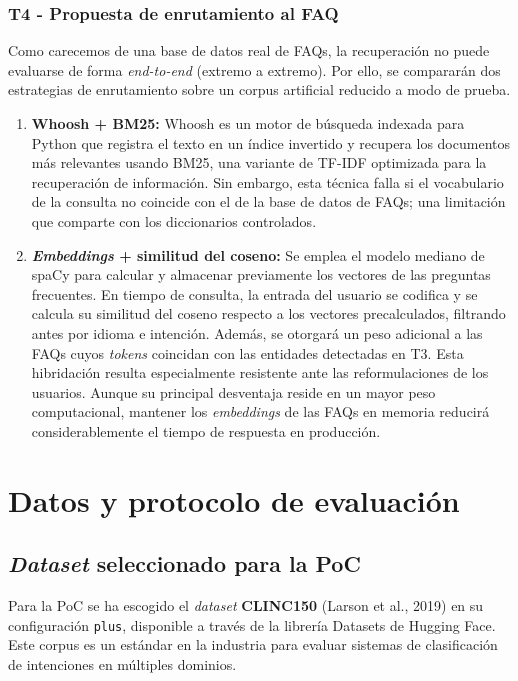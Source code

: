 \documentclass[11pt,a4paper,twoside]{article}
\theoremstyle{definition}
\numberwithin{equation}{section}
\begin{document}
\subsubsection*{T4 - Propuesta de enrutamiento al FAQ}
Como carecemos de una base de datos real de FAQs, la recuperación no puede evaluarse de forma \textit{end-to-end} (extremo a extremo). Por ello, se compararán dos estrategias de enrutamiento sobre un corpus artificial reducido a modo de prueba. 
\begin{enumerate}
	\item \textbf{Whoosh + BM25:} Whoosh es un motor de búsqueda indexada para Python que registra el texto en un índice invertido y recupera los documentos más relevantes usando BM25, una variante de TF-IDF optimizada para la recuperación de información. Sin embargo, esta técnica falla si el vocabulario de la consulta no coincide con el de la base de datos de FAQs; una limitación que comparte con los diccionarios controlados.
	
	\item \textbf{\textit{Embeddings} + similitud del coseno:} Se emplea el modelo mediano de spaCy para calcular y almacenar previamente los vectores de las preguntas frecuentes. En tiempo de consulta, la entrada del usuario se codifica y se calcula su similitud del coseno respecto a los vectores precalculados, filtrando antes por idioma e intención. Además, se otorgará un peso adicional a las FAQs cuyos \textit{tokens} coincidan con las entidades detectadas en T3. Esta hibridación resulta especialmente resistente ante las reformulaciones de los usuarios. Aunque su principal desventaja reside en un mayor peso computacional, mantener los \textit{embeddings} de las FAQs en memoria reducirá considerablemente el tiempo de respuesta en producción.
\end{enumerate}


\section{Datos y protocolo de evaluación}
\subsection{\textit{Dataset} seleccionado para la PoC}
Para la PoC se ha escogido el \textit{dataset} \textbf{CLINC150} (Larson et al., 2019) en su configuración \texttt{plus}, disponible a través de la librería Datasets de Hugging Face. Este corpus es un estándar en la industria para evaluar sistemas de clasificación de intenciones en múltiples dominios.
\end{document}

